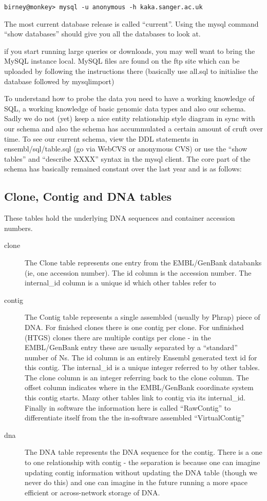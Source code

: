 \documentclass[11pt,a4paper]{article}
\begin{document}
\begin{verbatim}
birney@monkey> mysql -u anonymous -h kaka.sanger.ac.uk
\end{verbatim}



The most current database release is called ``current''. Using the
mysql command ``show databases'' should give you all the databases to
look at.


if you start running large queries or downloads, you may well want to
bring the MySQL instance local. MySQL files are found on the ftp site
which can be uploaded by following the instructions there (basically
use all.sql to initialise the database followed by mysqlimport)

To understand how to probe the data you need to have a working
knowledge of SQL, a working knowledge of basic genomic data types and
also our schema. Sadly we do not (yet) keep a nice entity relationship
style diagram in sync with our schema and also the schema has
accummulated a certain amount of cruft over time. To see our current
schema, view the DDL statements in ensembl/sql/table.sql (go via
WebCVS or anonymous CVS) or use the ``show tables'' and ``describe
XXXX'' syntax in the mysql client. The core part of the schema has
basically remained constant over the last year and is as follows:

\subsection{Clone, Contig and DNA tables}

These tables hold the underlying DNA sequences and container accession numbers.

\begin{description}
\item[clone] The Clone table represents one entry from the
EMBL/GenBank databanks (ie, one accession number). The id column is
the accession number. The internal\_id column is a unique id which 
other tables refer to
\item[contig] The Contig table represents a single assembled (usually by
Phrap) piece of DNA. For finished clones there is one contig per clone. For
unfinished (HTGS) clones there are multiple contigs per clone - in the EMBL/GenBank
entry these are usually separated by a ``standard'' number of Ns. The id column
is an entirely Ensembl generated text id for this contig. The internal\_id is a
unique integer referred to by other tables. The clone column is an integer referring
back to the clone column. The offset column indicates where in the EMBL/GenBank
coordinate system this contig starts. Many other tables link to contig via its
internal\_id. Finally in software the information here is called ``RawContig'' to 
differentiate itself from the the in-software assembled ``VirtualContig''
\item[dna] The DNA table represents the DNA sequence for the contig. There is a
one to one relationship with contig - the separation is because one can imagine updating
contig information without updating the DNA table (though we never do this) and 
one can imagine in the future running a more space efficient or across-network storage
of DNA.
\end{description}
\end{document}
